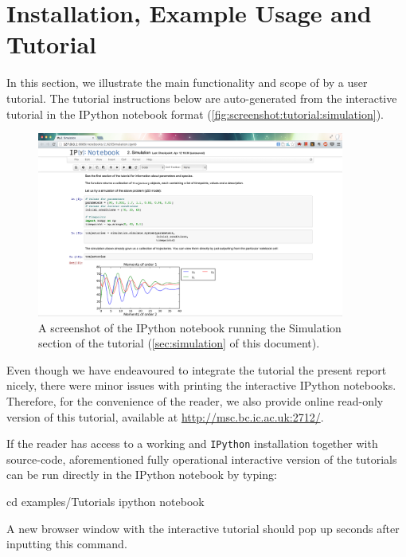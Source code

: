 \section{Installation, Example Usage and Tutorial} \label{examples}

In this section, we illustrate the main functionality and scope of \means{} by a user tutorial.
The tutorial instructions below are auto-generated from the interactive tutorial in the IPython notebook format (\autoref{fig:screenshot:tutorial:simulation}).

\begin{figure}[ht]
    \centering
    \includegraphics[width=0.9\textwidth]{handmade_figures/tutorial-screenshot.png}
    \caption{A screenshot of the IPython notebook running the Simulation section of the tutorial (\autoref{sec:simulation} of this document).}
    \label{fig:screenshot:tutorial:simulation}
\end{figure}

Even though we have endeavoured to integrate the tutorial the present report nicely, there were minor issues with printing the interactive IPython notebooks.
Therefore, for the convenience of the reader, we also provide online read-only version of this tutorial, available at \url{http://msc.bc.ic.ac.uk:2712/}.

If the reader has access to a working \means{} and \verb"IPython" installation together with \means{} source-code,
aforementioned fully operational interactive version of the tutorials can be run directly in the IPython notebook by typing:

\begin{InputVerbatim}
cd examples/Tutorials
ipython notebook
\end{InputVerbatim}

A new browser window with the interactive tutorial should pop up seconds after inputting this command.

